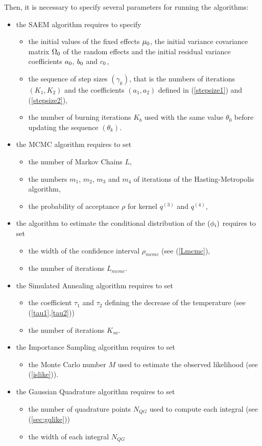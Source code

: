 Then, it is necessary to specify several parameters for running the algorithms:
\begin{itemize}
\item the SAEM algorithm requires to specify
\begin{itemize}
\item the initial values of the fixed effects $\fixed_effect_0$, the initial variance covariance matrix ${\Omega}_0$ of the random effects and the initial residual variance coefficients $a_0$, $b_0$ and $c_0$,
\item the sequence of step sizes $(\gamma_k)$, that is the numbers of iterations $(K_1,K_2)$ and the coefficients  $(a_1,a_2)$ defined in (\ref{stepsize1}) and (\ref{stepsize2}),
\item the number of burning iterations $K_b$ used with the same value $\theta_0$ before updating the sequence $(\theta_k)$.
\end{itemize}
\item the MCMC algorithm requires to set
\begin{itemize}
\item the number of Markov Chains $L$,
\item the numbers $m_1$, $m_2$, $m_3$ and $m_4$ of iterations of the Hasting-Metropolis algorithm,
\item the probability of acceptance $\rho$ for  kernel $q^{(3)}$ and $q^{(4)}$,
\end{itemize}
\item the algorithm to estimate the conditional distribution of the $({\phi}_i)$ requires to set
\begin{itemize}
\item the width of the confidence interval $\rho_{mcmc}$ (see (\ref{Lmcmc}),
\item the number of iterations $L_{mcmc}$.
\end{itemize}
\item the Simulated Annealing algorithm requires to set
\begin{itemize}
\item the coefficient $\tau_1$ and $\tau_2$ defining the decrease of the temperature (see (\ref{tau1},\ref{tau2}))
\item the number of iterations $K_{sa}$.
\end{itemize}
\item the Importance Sampling algorithm requires to set
\begin{itemize}
\item the Monte Carlo number $M$ used to estimate the observed likelihood (see (\ref{islike})).
\end{itemize}
\item the Gaussian Quadrature algorithm requires to set
\begin{itemize}
\item the number of quadrature points $N_{QG}$ used to compute each integral (see (\ref{sec:gqlike}))
\item the width of each integral $N_{QG}$
\end{itemize}
\end{itemize}

